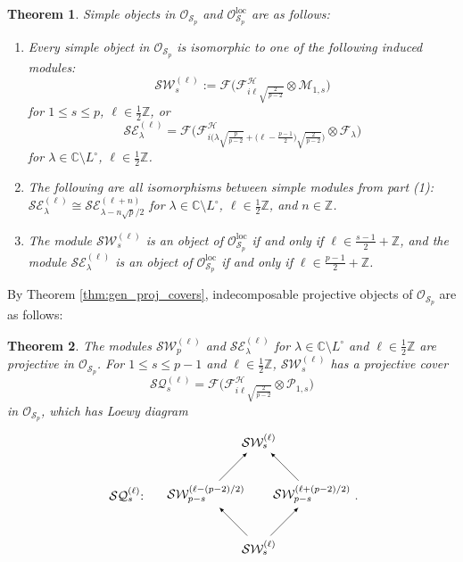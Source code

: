 \documentclass[11pt, reqno]{amsart}
\newtheorem{thm}{Theorem}[section]
\theoremstyle{definition}\newtheorem{defi}[thm]{Definition}
\theoremstyle{definition}\newtheorem{rem}[thm]{Remark}
\theoremstyle{definition}\newtheorem{exam}[thm]{Example}
\theoremstyle{definition}\newtheorem{assum}[thm]{Assumption}
\newcommand{\cE}{\mathcal{E}}
\newcommand{\cH}{\mathcal{H}}
\newcommand{\cM}{\mathcal{M}}
\newcommand{\cS}{\mathcal{S}}
\newcommand{\cF}{\mathcal{F}}
\newcommand{\cO}{\mathcal{O}}
\newcommand{\cP}{\mathcal{P}}
\newcommand{\cW}{\mathcal{W}}
\newcommand{\CC}{\mathbb{C}}
\newcommand{\ZZ}{\mathbb{Z}}
\newcommand{\Oloc}{\cO^{\mathrm{loc}}}
\begin{document}
\begin{thm}\label{thm:Sp_mod_class}
Simple objects in $\cO_{\cS_p}$ and $\Oloc_{\cS_p}$ are as follows:
\begin{enumerate}
\item Every simple object in $\cO_{\cS_p}$ is isomorphic to one of the following induced modules:
\begin{equation*}
\cS\cW_s^{(\ell)} :=\cF\bigg(\cF^\cH_{i\ell\sqrt{\frac{2}{p-2}}}\otimes\cM_{1,s}\bigg)
\end{equation*}
for $1\leq s\leq p$, $\ell\in\frac{1}{2}\ZZ$, or
\begin{equation*}
\cS\cE_{\lambda}^{(\ell)}=\cF\bigg(\cF^{\cH}_{i\big(\lambda\sqrt{\frac{p}{p-2}}+\big(\ell-\frac{p-1}{2}\big)\sqrt{\frac{2}{p-2}}\big)}\otimes\cF_{\lambda}\bigg)
\end{equation*}
for $\lambda\in\CC\setminus L^\circ$, $\ell\in\frac{1}{2}\ZZ$.

\item The following are  all isomorphisms between simple modules from part (1): $\cS\cE_\lambda^{(\ell)}\cong\cS\cE_{\lambda-n\sqrt{p}/2}^{(\ell+n)}$
for $\lambda\in\CC\setminus L^\circ$, $\ell\in\frac{1}{2}\ZZ$, and $n\in\ZZ$.

\item The module $\cS\cW_s^{(\ell)}$ is an object of $\Oloc_{\cS_p}$ if and only if $\ell\in\frac{s-1}{2}+\ZZ$, and the module $\cS\cE_\lambda^{(\ell)}$ is an object of $\Oloc_{\cS_p}$ if and only if $\ell\in\frac{p-1}{2}+\ZZ$.
\end{enumerate}


\end{thm}

By Theorem \ref{thm:gen_proj_covers}, indecomposable projective objects of $\cO_{\cS_p}$ are as follows:
\begin{thm}
The modules $\cS\cW_p^{(\ell)}$ and $\cS\cE_{\lambda}^{(\ell)}$ for $\lambda \in \CC\setminus L^{\circ}$ and $\ell\in\frac{1}{2}\ZZ$ are projective in $\cO_{\mathcal{S}_p}$. For $1\leq s \leq p-1$ and $\ell\in\frac{1}{2}\ZZ$, $\cS\cW_{s}^{(\ell)}$ has a projective cover
 \begin{equation*}
  \cS\mathcal{Q}_{s}^{(\ell)}=\cF\bigg(\cF^\cH_{i\ell\sqrt{\frac{2}{p-2}}}\otimes\cP_{1,s}\bigg)
 \end{equation*}
in $\cO_{\mathcal{S}_p}$, which has Loewy diagram
\begin{equation*}\label{eqn:Qsl_Loewy_diag_Sp}
 \begin{matrix}
  \begin{tikzpicture}[->,>=latex,scale=1.5]
\node (b1) at (1,0) {$\cS\cW_{s}^{(\ell)}$};
\node (c1) at (-1.5, 1){$\cS\mathcal{Q}_{s}^{(\ell)}$:};
   \node (a1) at (0,1) {$\cS\cW_{p-s}^{(\ell-(p-2)/2)}$};
   \node (b2) at (2,1) {$\cS\cW_{p-s}^{(\ell+(p-2)/2)}$};
    \node (a2) at (1,2) {$\cS\cW_{s}^{(\ell)}$};
\draw[] (b1) -- node[left] {} (a1);
   \draw[] (b1) -- node[left] {} (b2);
    \draw[] (a1) -- node[left] {} (a2);
    \draw[] (b2) -- node[left] {} (a2);
\end{tikzpicture}
\end{matrix} .
 \end{equation*}
\end{thm}
\end{document}
